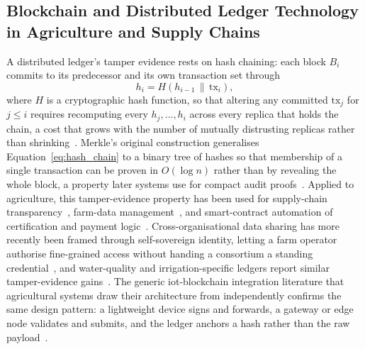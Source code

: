 \documentclass[12pt,a4paper,oneside]{book}
\begin{document}
\subsection{Blockchain and Distributed Ledger Technology in Agriculture and
Supply Chains}
\label{subsec:lit_blockchain_ag}

A distributed ledger's tamper evidence rests on hash chaining: each block
$B_i$ commits to its predecessor and its own transaction set through
\begin{equation}
h_i = H\!\left( h_{i-1} \,\|\, \mathrm{tx}_i \right),
\label{eq:hash_chain}
\end{equation}
where $H$ is a cryptographic hash function, so that altering any committed
$\mathrm{tx}_j$ for $j \le i$ requires recomputing every $h_j,\ldots,h_i$
across every replica that holds the chain, a cost that grows with the
number of mutually distrusting replicas rather than
shrinking~\cite{fernandez2024iotTamper}. Merkle's original construction
generalises Equation~\ref{eq:hash_chain} to a binary tree of hashes so that
membership of a single transaction can be proven in $O(\log n)$ rather than
by revealing the whole block, a property later systems use for compact
audit proofs~\cite{sharma2018merkle}. Applied to agriculture, this
tamper-evidence property has been used for supply-chain
transparency~\cite{tian2016agri, kamilaris2019rise, oh2025foodsafety,
galvez2018future, tian2017traceability, reyna2018blockchain, tian2017agri,
kamilaris2018food}, farm-data
management~\cite{lin2018blockchain, ferrag2020security, haque2024scalable,
zhang2019blockchain, aliyu2023blockchainbasedsmartfarm}, and smart-contract
automation of certification and payment
logic~\cite{rama2021systematic, patil2022blockchain, nguyen2022smartFarmingSC,
ahmad2025agriBlockchain, zhu2017blockchainAgri}. Cross-organisational data
sharing has more recently been framed through self-sovereign identity,
letting a farm operator authorise fine-grained access without handing a
consortium a standing credential~\cite{amraouy2025ssi}, and water-quality
and irrigation-specific ledgers report similar tamper-evidence
gains~\cite{saito2025blockchainWaterQuality, liu2024blockchainwater,
arshad2022blockchainBenefits, ali2023farmDataTampering,
rahman2019agriSecurity}. The generic \gls{iot}-blockchain integration
literature that agricultural systems draw their architecture from
independently confirms the same design pattern: a lightweight device signs
and forwards, a gateway or edge node validates and submits, and the ledger
anchors a hash rather than the raw
payload~\cite{dorri2017blockchain, nguyen2019blockchain, xu2020making,
reyna2018blockchain, benedict2021decentralized}.
\end{document}
